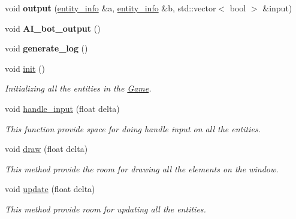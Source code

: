 \begin{DoxyCompactItemize}
\item 
\mbox{\label{classcp_1_1_game_simulator_a5c67da11f83aef5976895104f24dd70a}} 
void {\bfseries output} (\hyperlink{classcp_1_1entity__info}{entity\+\_\+info} \&a, \hyperlink{classcp_1_1entity__info}{entity\+\_\+info} \&b, std\+::vector$<$ bool $>$ \&input)
\item 
\mbox{\label{classcp_1_1_game_simulator_a69efe33b404b070b07cec35e8d396c34}} 
void {\bfseries A\+I\+\_\+bot\+\_\+output} ()
\item 
\mbox{\label{classcp_1_1_game_simulator_a4840d30b48ce4493ae4631387b914bc8}} 
void {\bfseries generate\+\_\+log} ()
\item 
\mbox{\label{classcp_1_1_game_simulator_acc82bdb23b927ee977fa5fdea29f4bc1}} 
void \hyperlink{classcp_1_1_game_simulator_acc82bdb23b927ee977fa5fdea29f4bc1}{init} ()
\begin{DoxyCompactList}\small\item\em Initializing all the entities in the \hyperlink{classcp_1_1_game}{Game}. \end{DoxyCompactList}\item 
void \hyperlink{classcp_1_1_game_simulator_ab41fde16054aafe338df7e4d5590eeae}{handle\+\_\+input} (float delta)
\begin{DoxyCompactList}\small\item\em This function provide space for doing handle input on all the entities. \end{DoxyCompactList}\item 
void \hyperlink{classcp_1_1_game_simulator_a52971edf1b8258ea825d8c2fec9e30d1}{draw} (float delta)
\begin{DoxyCompactList}\small\item\em This method provide the room for drawing all the elements on the window. \end{DoxyCompactList}\item 
void \hyperlink{classcp_1_1_game_simulator_a6a0cd908ab20a8b776620f168846730c}{update} (float delta)
\begin{DoxyCompactList}\small\item\em This method provide room for updating all the entities. \end{DoxyCompactList}\item 

\end{DoxyCompactItemize}
